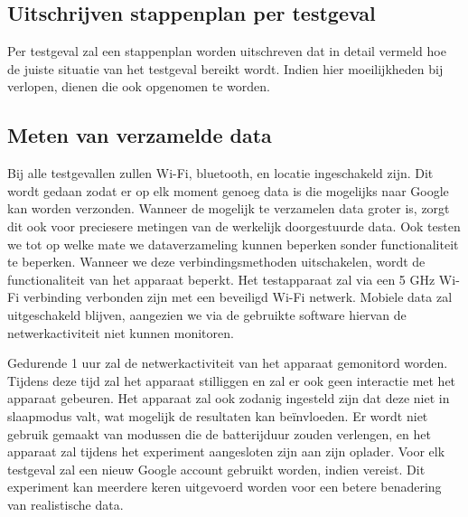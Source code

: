 \subsection{Uitschrijven stappenplan per testgeval}
Per testgeval zal een stappenplan worden uitschreven dat in detail vermeld hoe de juiste situatie van het testgeval bereikt wordt. Indien hier moeilijkheden bij verlopen, dienen die ook opgenomen te worden.

\subsection{Meten van verzamelde data}
Bij alle testgevallen zullen Wi-Fi, bluetooth, en locatie ingeschakeld zijn. Dit wordt gedaan zodat er op elk moment genoeg data is die mogelijks naar Google kan worden verzonden. Wanneer de mogelijk te verzamelen data groter is, zorgt dit ook voor preciesere metingen van de werkelijk doorgestuurde data. Ook  testen we tot op welke mate we dataverzameling kunnen beperken sonder functionaliteit te beperken. Wanneer we deze verbindingsmethoden uitschakelen, wordt de functionaliteit van het apparaat beperkt. Het testapparaat zal via een 5 GHz Wi-Fi verbinding verbonden zijn met een beveiligd Wi-Fi netwerk. Mobiele data zal uitgeschakeld blijven, aangezien we via de gebruikte software hiervan de netwerkactiviteit niet kunnen monitoren.

Gedurende 1 uur zal de netwerkactiviteit van het apparaat gemonitord worden. Tijdens deze tijd zal het apparaat stilliggen en zal er ook geen interactie met het apparaat gebeuren. Het apparaat zal ook zodanig ingesteld zijn dat deze niet in slaapmodus valt, wat mogelijk de resultaten kan beïnvloeden. Er wordt niet gebruik gemaakt van modussen die de batterijduur zouden verlengen, en het apparaat zal tijdens het experiment aangesloten zijn aan zijn oplader. Voor elk testgeval zal een nieuw Google account gebruikt worden, indien vereist. Dit experiment kan meerdere keren uitgevoerd worden voor een betere benadering van realistische data.




